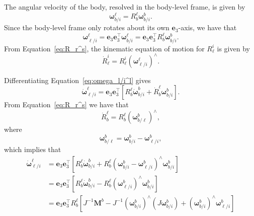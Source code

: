 The angular velocity of the body, resolved in the body-level frame, is given by
\[
\boldsymbol{\omega}_{b/i}^\ell = R_b^\ell \boldsymbol{\omega}_{b/i}^b.
\]
Since the body-level frame only rotates about its own $\mathbf{e}_3$-axis, we have that
\begin{equation}\label{eq:omega_l/i^l}
\boldsymbol{\omega}_{\ell/i}^\ell 
	= \mathbf{e}_3 \mathbf{e}_3^\top \boldsymbol{\omega}_{b/i}^\ell
	= \mathbf{e}_3 \mathbf{e}_3^\top R_b^\ell \boldsymbol{\omega}_{b/i}^b.
\end{equation}
From Equation~\eqref{eq:R_r^s}, the kinematic equation of motion for $R_\ell^i$ is given by
\[
\dot{R}_\ell^i = R_\ell^i(\boldsymbol{\omega}_{\ell/i}^\ell)^\wedge.
\]

Differentiating Equation~\eqref{eq:omega_l/i^l} gives
\[
\dot{\boldsymbol{\omega}}_{\ell/i}^\ell = \mathbf{e}_3\mathbf{e}_3^\top \left[ R_b^\ell \dot{\boldsymbol{\omega}}_{b/i}^b + \dot{R}_b^\ell \boldsymbol{\omega}_{b/i}^b \right].
\]
From Equation~\eqref{eq:R_r^s} we have that
\[
\dot{R}_b^\ell = R_b^\ell (\boldsymbol{\omega}_{b/\ell}^b)^\wedge,
\]
where 
\[
\boldsymbol{\omega}_{b/\ell}^b = \boldsymbol{\omega}_{b/i}^b - \boldsymbol{\omega}_{\ell/i}^b,
\]
which implies that
\begin{align*}
\dot{\boldsymbol{\omega}}_{\ell/i}^\ell &= \mathbf{e}_3\mathbf{e}_3^\top \left[ R_b^\ell \dot{\boldsymbol{\omega}}_{b/i}^b + R_b^\ell (\boldsymbol{\omega}_{b/i}^b - \boldsymbol{\omega}_{\ell/i}^b)^\wedge \boldsymbol{\omega}_{b/i}^b \right] \\
&= \mathbf{e}_3\mathbf{e}_3^\top \left[ R_b^\ell \dot{\boldsymbol{\omega}}_{b/i}^b - R_b^\ell (\boldsymbol{\omega}_{\ell/i}^b)^\wedge \boldsymbol{\omega}_{b/i}^b \right] \\
&= \mathbf{e}_3\mathbf{e}_3^\top R_b^\ell \left[  J^{-1}\mathbf{M}^b - J^{-1}(\boldsymbol{\omega}_{b/i}^b)^\wedge (J\boldsymbol{\omega}_{b/i}^b) + (\boldsymbol{\omega}_{b/i}^b)^\wedge \boldsymbol{\omega}_{\ell/i}^b \right] \\
\end{align*}

